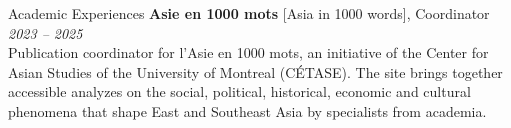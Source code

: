 \documentclass{resume} %
\begin{document}
\begin{rSection}{Academic Experiences}
{\bf Asie en 1000 mots}{ [Asia in 1000 words], Coordinator} \hfill {\em 2023 -- 2025}\\
Publication coordinator for l'Asie en 1000 mots, an initiative of the Center for Asian Studies of the University of Montreal (CÉTASE). The site brings together accessible analyzes on the social, political, historical, economic and cultural phenomena that shape East and Southeast Asia by specialists from academia. 

\clearpage


\end{rSection}
\end{document}
